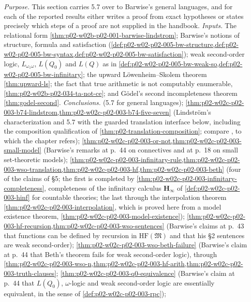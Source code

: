 \emph{Purpose.}  This section carries 5.7 over to Barwise's general
languages, and for each of the reported results either writes a proof
from exact hypotheses or states precisely which steps of a proof are not
supplied in the handbook.  \emph{Inputs.}  The relational form
\cref{thm:p02-w02b-p02-001-barwise-lindstrom}; Barwise's notions of
structure, formula and satisfaction
(\cref{def:p02-w02-p02-005-bw-structure,def:p02-w02-p02-005-bw-syntax,def:p02-w02-p02-005-bw-satisfaction});
weak second-order logic, \(L_{\omega_1\omega}\), \(L(Q_0)\) and \(L(Q)\)
as in \cref{def:p02-w02-p02-005-bw-weak-so,def:p02-w02-p02-005-bw-infinitary};
the upward L\"owenheim--Skolem theorem \cref{thm:upward-ls}; the fact
that true arithmetic is not computably enumerable,
\cref{thm:p02-w02b-p02-034-ta-not-ce}; and G\"odel's second
incompleteness theorem \cref{thm:godel-second}.  \emph{Conclusions.}
 (5.7 for general languages);
\cref{thm:p02-w02c-p02-003-b74-lindstrom,thm:p02-w02c-p02-003-b74-five-seven}
(Lindstr\"om's characterization and 5.7 with the guarded translation
interface below, including the composition qualification of
\cref{thm:p02-translation-composition}; compare
\cite{Barwise1974Axioms}, to which the chapter refers);
\cref{thm:p02-w02c-p02-003-or-not,thm:p02-w02c-p02-003-small-model}
(Barwise's remarks at p.~44 on connectives and at p.~18 on small
set-theoretic models);
\cref{thm:p02-w02c-p02-003-infinitary-rule,thm:p02-w02c-p02-003-wso-translation,thm:p02-w02c-p02-003-hf,thm:p02-w02c-p02-003-beth}
(four of the claims of \S5; the first is completed by
\cref{thm:p02-w02c-p02-003-infinitary-completeness}, completeness of the
infinitary calculus \(\mathbf H_{\infty}\) of
\cref{def:p02-w02c-p02-003-hinf} for countable theories; the last through the interpolation
theorem \cref{thm:p02-w02c-p02-003-interpolation}, which is proved here
from a model existence theorem,
\cref{thm:p02-w02c-p02-003-model-existence});
\cref{thm:p02-w02c-p02-003-hf-recursion,thm:p02-w02c-p02-003-wso-sentences}
(Barwise's claims at p.~43 that functions can be defined by recursion in
\(\mathrm{HF}(\mathfrak M)\) and that his \S2 sentences are weak
second-order);
\cref{thm:p02-w02c-p02-003-wso-beth-failure} (Barwise's claim at p.~44
that Beth's theorem fails for weak second-order logic), through
\cref{thm:p02-w02c-p02-003-wso-n,thm:p02-w02c-p02-003-hf-arith,thm:p02-w02c-p02-003-truth-clauses};
\cref{thm:p02-w02c-p02-003-q0-equivalence} (Barwise's claim at p.~44 that
\(L(Q_0)\), \(\omega\)-logic and weak second-order logic are essentially
equivalent, in the sense of \cref{def:p02-w02c-p02-003-rpc});
